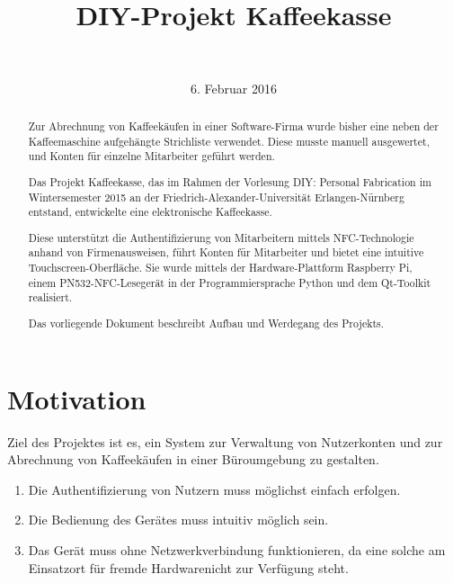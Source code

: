 \documentclass[11pt,a4paper]{IEEEtran}
\begin{document}
\title{DIY-Projekt Kaffeekasse} \author{\\
}

\date{6. Februar 2016}

\maketitle
\begin{abstract} 
    Zur Abrechnung von Kaffeekäufen in einer Software-Firma wurde bisher eine
    neben der Kaffeemaschine aufgehängte Strichliste verwendet. Diese musste
    manuell ausgewertet, und Konten für einzelne Mitarbeiter geführt werden.

    Das Projekt \glqq Kaffeekasse\grqq, das im Rahmen der Vorlesung \glqq DIY:
    Personal Fabrication\grqq{ } im Wintersemester 2015 an der 
    Friedrich-Alexander-Universität Erlangen-Nürnberg entstand, entwickelte eine 
    elektronische Kaffeekasse. 
    
    Diese unterstützt die Authentifizierung von Mitarbeitern mittels 
    NFC-Technologie anhand von Firmenausweisen, führt Konten für Mitarbeiter und 
    bietet eine intuitive Touchscreen-Oberfläche. Sie wurde mittels der 
    Hardware-Plattform Raspberry Pi, einem PN532-NFC-Lesegerät in der
    Programmiersprache Python und dem Qt-Toolkit realisiert.

    Das vorliegende Dokument beschreibt Aufbau und Werdegang des Projekts.
\end{abstract}

\section{Motivation}

Ziel des Projektes ist es, ein System zur Verwaltung von Nutzerkonten und zur
Abrechnung von Kaffeekäufen in einer Büroumgebung zu gestalten. 

\begin{enumerate} 
    \item\label{req0} Die Authentifizierung von Nutzern muss möglichst einfach 
        erfolgen.  
    \item\label{req1} Die Bedienung des Gerätes muss
        intuitiv möglich sein.  
    \item\label{req2} Das Gerät muss ohne
        Netzwerkverbindung funktionieren, da eine solche am Einsatzort für 
        \glqq fremde Hardware\grqq{ }nicht zur Verfügung steht.
\end{enumerate}
\end{document}

